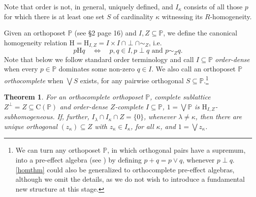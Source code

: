 \documentclass{amsart}
\newtheorem{thm}{Theorem}[section]
\theoremstyle{definition}
\numberwithin{equation}{section}
\begin{document}
Note that order is not, in general, uniquely defined, and $I_\kappa$ consists of all those $p$ for which there is at least one set $S$ of cardinality $\kappa$ witnessing its $R$-homogeneity.

Given an orthoposet $\mathbb{P}$ (see \cite{Kalmbach1983} \S2 page 16) and $I,Z\subseteq\mathbb{P}$, we define the canonical homogeneity relation $\mathrm{H}=\mathrm{H}_{I,Z}=I\times I\ \cap\perp\cap\sim_Z$, i.e. \[p\mathrm{H}q\quad\Leftrightarrow\quad p,q\in I,p\perp q\textrm{ and }p\sim_Zq.\]  Note that below we follow standard order terminology and call $I\subseteq\mathbb{P}$ \emph{order-dense} when every $p\in\mathbb{P}$ dominates some non-zero $q\in I$.  We also call an orthoposet $\mathbb{P}$ \emph{orthocomplete} when $\bigvee S$ exists, for any pairwise orthogonal $S\subseteq\mathbb{P}$.\footnote{We can turn any orthoposet $\mathbb{P}$, in which orthogonal pairs have a supremum, into a pre-effect algebra (see \cite{ChajdaKuhr2012}) by defining $p+q=p\vee q$, whenever $p\perp q$.  \autoref{homthm} could also be generalized to orthocomplete pre-effect algebras, although we omit the details, as we do not wish to introduce a fundamental new structure at this stage.}

\begin{thm}\label{homthm}
For an orthocomplete orthoposet $\mathbb{P}$, complete sublattice $Z^\perp=Z\subseteq\mathrm{C}(\mathbb{P})$ and order-dense $Z$-complete $I\subseteq\mathbb{P}$, $1=\bigvee\mathbb{P}$ is $\mathrm{H}_{I,Z}$-subhomogeneous.  If, further, $I_\lambda\cap I_\kappa\cap Z=\{0\}$, whenever $\lambda\neq\kappa$, then there are unique orthogonal $(z_\kappa)\subseteq Z$ with $z_\kappa\in I_\kappa$, for all $\kappa$, and $1=\bigvee z_\kappa$.
\end{thm}
\end{document}
